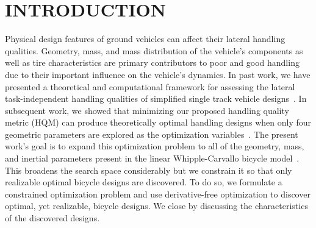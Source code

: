 \documentclass{bmd2019p}
\begin{document}
\section{INTRODUCTION}
%
Physical design features of ground vehicles can affect their lateral handling
qualities. Geometry, mass, and mass distribution of the vehicle's components as
well as tire characteristics are primary contributors to poor and good handling
due to their important influence on the vehicle's dynamics. In past work, we
have presented a theoretical and computational framework for assessing the
lateral task-independent handling qualities of simplified single track vehicle
designs~\cite{Hess2012,Moore2012}. In subsequent work, we showed that
minimizing our proposed handling quality metric (HQM) can produce theoretically
optimal handling designs when only four geometric parameters are explored as
the optimization variables~\cite{Moore2016}. The present work's goal is to
expand this optimization problem to all of the geometry, mass, and inertial
parameters present in the linear Whipple-Carvallo bicycle
model~\cite{Meijaard2007}. This broadens the search space considerably but we
constrain it so that only realizable optimal bicycle designs are discovered. To
do so, we formulate a constrained optimization problem and use derivative-free
optimization to discover optimal, yet realizable, bicycle designs. We close by
discussing the characteristics of the discovered designs.
\end{document}
